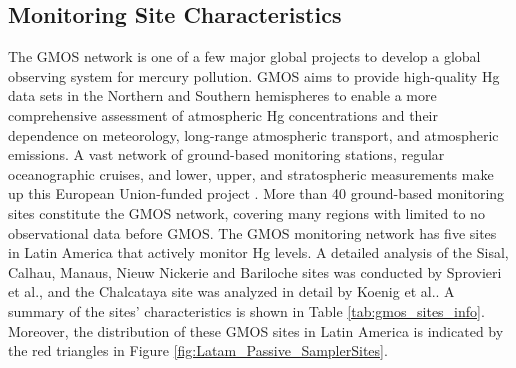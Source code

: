 \subsection{Monitoring Site Characteristics} \label{c2_monitoring_site_characteristics}
\begin{flushleft}
 The GMOS network is one of a few major global projects to develop a global observing system for mercury pollution. GMOS aims to provide high-quality Hg data sets in the Northern and Southern hemispheres to enable a more comprehensive assessment of atmospheric Hg concentrations and their dependence on meteorology, long-range atmospheric transport, and atmospheric emissions\cite{sprovieri_atmospheric_2016}. A vast network of ground-based monitoring stations, regular oceanographic cruises, and lower, upper, and stratospheric measurements make up this European Union-funded project \cite{koenig_seasonal_2021,sprovieri_atmospheric_2016}. More than 40 ground-based monitoring sites constitute the GMOS network, covering many regions with limited to no observational data before GMOS\cite{sprovieri_atmospheric_2016}. The GMOS monitoring network has five sites in Latin America that actively monitor Hg levels. A detailed analysis of the Sisal, Calhau, Manaus, Nieuw Nickerie and Bariloche sites was conducted by Sprovieri et al.\cite{sprovieri_atmospheric_2016}, and the Chalcataya site was analyzed in detail by Koenig et al.\cite{koenig_seasonal_2021}. A summary of the sites' characteristics is shown in Table \ref{tab:gmos_sites_info}. Moreover, the distribution of these GMOS sites in Latin America is indicated by the red triangles in Figure \ref{fig:Latam_Passive_SamplerSites}. 
  \end{flushleft}
  
